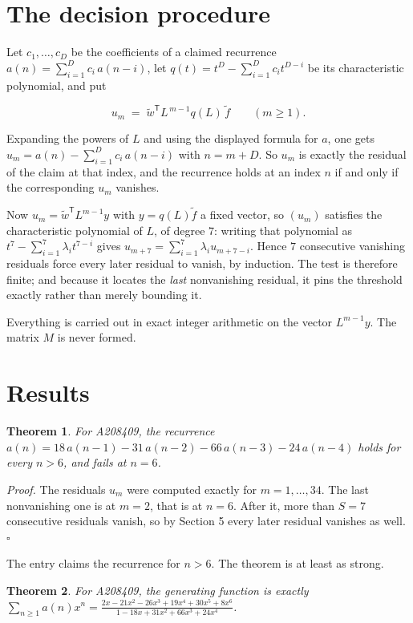 \documentclass[11pt]{article}
\newtheorem{theorem}{Theorem}
\theoremstyle{definition}
\begin{document}
\section{The decision procedure}

Let $c_1,\dots,c_D$ be the coefficients of a claimed recurrence $a(n) = \sum_{i=1}^{D} c_i\,a(n-i)$, let $q(t) = t^{D} - \sum_{i=1}^{D} c_i t^{D-i}$ be its characteristic polynomial, and put

\[u_m \;=\; \tilde w^{\mathsf T} L^{\,m-1} q(L)\,\tilde f \qquad (m \ge 1).\]

Expanding the powers of $L$ and using the displayed formula for $a$, one gets $u_m = a(n) - \sum_{i=1}^{D} c_i\,a(n-i)$ with $n = m + D$. So $u_m$ is exactly the residual of the claim at that index, and the recurrence holds at an index $n$ if and only if the corresponding $u_m$ vanishes.

Now $u_m = \tilde w^{\mathsf T} L^{m-1} y$ with $y = q(L)\tilde f$ a fixed vector, so $(u_m)$ satisfies the characteristic polynomial of $L$, of degree $7$: writing that polynomial as $t^{7} - \sum_{i=1}^{7} \lambda_i t^{7-i}$ gives $u_{m+7} = \sum_{i=1}^{7} \lambda_i u_{m+7-i}$. Hence $7$ consecutive vanishing residuals force every later residual to vanish, by induction. The test is therefore finite; and because it locates the {\itshape last} nonvanishing residual, it pins the threshold exactly rather than merely bounding it.

Everything is carried out in exact integer arithmetic on the vector $L^{m-1}y$. The matrix $M$ is never formed.

\section{Results}

\begin{theorem} For A208409, the recurrence $a(n) = 18\,a(n-1) - 31\,a(n-2) - 66\,a(n-3) - 24\,a(n-4)$ holds for every $n > 6$, and fails at $n = 6$.\end{theorem}

{\itshape Proof.} The residuals $u_m$ were computed exactly for $m = 1,\dots,34$. The last nonvanishing one is at $m = 2$, that is at $n = 6$. After it, more than $S = 7$ consecutive residuals vanish, so by Section 5 every later residual vanishes as well. $\square$

The entry claims the recurrence for $n > 6$. The theorem is at least as strong.

\begin{theorem} For A208409, the generating function is exactly $\sum_{n\ge 1} a(n)x^n = \frac{2x - 21x^{2} - 26x^{3} + 19x^{4} + 30x^{5} + 8x^{6}}{1 - 18x + 31x^{2} + 66x^{3} + 24x^{4}}$.\end{theorem}
\end{document}

